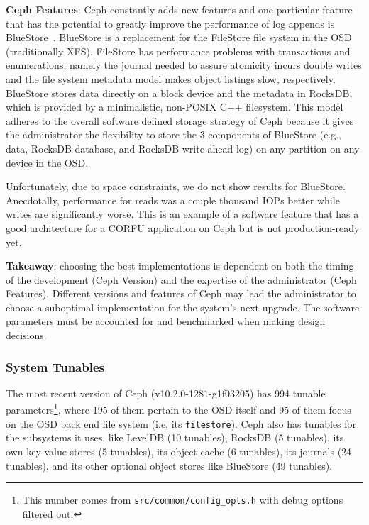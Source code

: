 \documentclass[10pt,twocolumn]{article}
\begin{document}
\textbf{Ceph Features}: Ceph constantly adds new features and one particular
feature that has the potential to greatly improve the performance of log
appends is BlueStore~\cite{weil:vault2016-bluestore}. BlueStore is a
replacement for the FileStore file system in the OSD (traditionally XFS).
FileStore has performance problems with transactions and enumerations; namely
the journal needed to assure atomicity incurs double writes and the file system
metadata model makes object listings slow, respectively. BlueStore stores data
directly on a block device and the metadata in RocksDB, which is provided by a
minimalistic, non-POSIX C++ filesystem. This model adheres to the overall
software defined storage strategy of Ceph because it gives the administrator
the flexibility to store the 3 components of BlueStore (e.g., data, RocksDB
database, and RocksDB write-ahead log) on any partition on any device in the
OSD. 

Unfortunately, due to space constraints, we do not show results for BlueStore.
Anecdotally, performance for reads was a couple thousand IOPs better while
writes are significantly worse. This is an example of a software feature that
has a good architecture for a CORFU application on Ceph but is not
production-ready yet. 

\textbf{Takeaway}: choosing the best implementations is dependent on both the
timing of the development (Ceph Version) and the expertise of the administrator
(Ceph Features). Different versions and features of Ceph may lead the
administrator to choose a suboptimal implementation for the system's next
upgrade. The software parameters must be accounted for and benchmarked when
making design decisions.

\subsubsection{System Tunables}

The most recent version of Ceph (v10.2.0-1281-g1f03205) has 994 tunable
parameters\footnote{This number comes from \texttt{src/common/config\_opts.h}
with debug options filtered out.}, where 195 of them pertain to the OSD itself
and 95 of them focus on the OSD back end file system (i.e. its
\texttt{filestore}). Ceph also has tunables for the subsystems it uses, like
LevelDB (10 tunables), RocksDB (5 tunables), its own key-value stores (5
tunables), its object cache (6 tunables), its journals (24 tunables), and its
other optional object stores like BlueStore (49 tunables).
\end{document}
